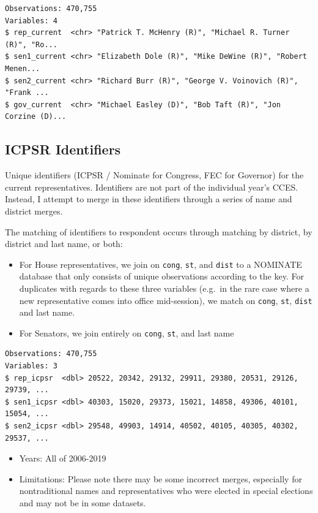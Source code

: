 \documentclass[10pt,article,oneside]{memoir}
\theoremstyle{definition}
\begin{document}
\begin{verbatim}
Observations: 470,755
Variables: 4
$ rep_current  <chr> "Patrick T. McHenry (R)", "Michael R. Turner (R)", "Ro...
$ sen1_current <chr> "Elizabeth Dole (R)", "Mike DeWine (R)", "Robert Menen...
$ sen2_current <chr> "Richard Burr (R)", "George V. Voinovich (R)", "Frank ...
$ gov_current  <chr> "Michael Easley (D)", "Bob Taft (R)", "Jon Corzine (D)...
\end{verbatim}

\hypertarget{icpsr-identifiers}{%
\subsection{ICPSR Identifiers}\label{icpsr-identifiers}}

Unique identifiers (ICPSR / Nominate for Congress, FEC for Governor) for
the current representatives. Identifiers are not part of the individual
year's CCES. Instead, I attempt to merge in these identifiers through a
series of name and district merges.

The matching of identifiers to respondent occurs through matching by
district, by district and last name, or both:

\begin{itemize}
\tightlist
\item
  For House representatives, we join on \texttt{cong}, \texttt{st}, and
  \texttt{dist} to a NOMINATE database that only consists of unique
  observations according to the key. For duplicates with regards to
  these three variables (e.g.~in the rare case where a new
  representative comes into office mid-session), we match on
  \texttt{cong}, \texttt{st}, \texttt{dist} and last name.
\item
  For Senators, we join entirely on \texttt{cong}, \texttt{st}, and last
  name
\end{itemize}

\begin{verbatim}
Observations: 470,755
Variables: 3
$ rep_icpsr  <dbl> 20522, 20342, 29132, 29911, 29380, 20531, 29126, 29739, ...
$ sen1_icpsr <dbl> 40303, 15020, 29373, 15021, 14858, 49306, 40101, 15054, ...
$ sen2_icpsr <dbl> 29548, 49903, 14914, 40502, 40105, 40305, 40302, 29537, ...
\end{verbatim}

\begin{itemize}
\tightlist
\item
  Years: All of 2006-2019
\item
  Limitations: Please note there may be some incorrect merges,
  especially for nontraditional names and representatives who were
  elected in special elections and may not be in some datasets.
\end{itemize}
\end{document}
